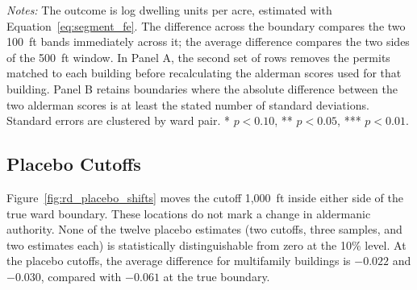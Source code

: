 \begin{table}[htbp]
    \centering
    \caption{Density Estimates Under Alternative Measures of Boundary Stringency}
    \label{tab:density_score_robustness}
    \resizebox{0.9\textwidth}{!}{%
    }
    \begin{minipage}{0.9\textwidth}
        \vspace{0.35em}
        \footnotesize
        \textit{Notes:} The outcome is log dwelling units per acre, estimated with Equation~\eqref{eq:segment_fe}.
        The difference across the boundary compares the two 100~ft bands immediately across it; the average difference compares the two sides of the 500~ft window.
        In Panel A, the second set of rows removes the permits matched to each building before recalculating the alderman scores used for that building.
        Panel B retains boundaries where the absolute difference between the two alderman scores is at least the stated number of standard deviations.
        Standard errors are clustered by ward pair.
        * $p<0.10$, ** $p<0.05$, *** $p<0.01$.
    \end{minipage}
\end{table}

\subsection{Placebo Cutoffs}
\label{subsec:density_placebo_cutoffs}

Figure~\ref{fig:rd_placebo_shifts} moves the cutoff 1,000~ft inside either side of the true ward boundary.
These locations do not mark a change in aldermanic authority.
None of the twelve placebo estimates (two cutoffs, three samples, and two estimates each) is statistically distinguishable from zero at the 10\% level.
At the placebo cutoffs, the average difference for multifamily buildings is $-0.022$ and $-0.030$, compared with $-0.061$ at the true boundary.

